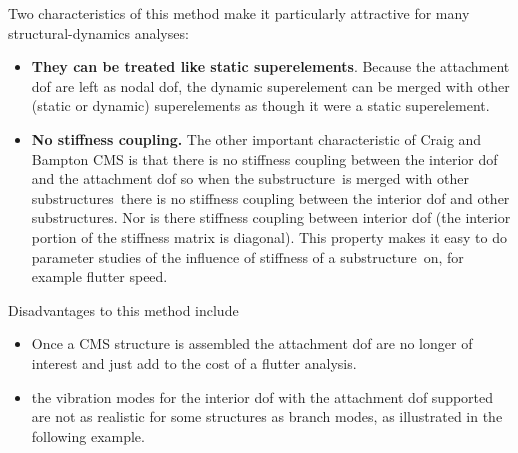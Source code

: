 \documentclass[11pt,openany,twoside]{book}
\numberwithin{equation}{section}		%
\newcommand{\Ss}{substructure}
\newcommand{\Sss}{substructures}
\begin{document}
Two characteristics of this method make it particularly attractive
for many structural-dynamics analyses:
\begin{itemize}
\item
{\bfseries They can be treated like static superelements\/}.
Because the attachment dof are left as nodal dof, the dynamic superelement
can be merged with other (static or dynamic) superelements
as though it were a static superelement.
                
\item {\bfseries No stiffness coupling.} The other important
	characteristic of Craig and Bampton CMS is that there is no
	stiffness coupling between the interior dof and the attachment
	dof so when the \Ss\ is merged with other \Sss\ there is no
	stiffness coupling between the interior dof and other \Sss.
	Nor is there stiffness coupling between interior dof
	(the interior portion of the stiffness matrix is diagonal).
	This property makes it easy to do parameter studies of the
	influence of stiffness of a \Ss\ on, for example flutter speed.
\end{itemize}
Disadvantages to this method include
\begin{itemize}
\item Once a CMS structure is assembled the attachment dof are no longer
of interest and just add to the cost of a flutter analysis.
\item the vibration modes for the interior dof with the attachment dof
	supported are not as realistic for some structures as branch modes,
	as illustrated in the following example.
\end{itemize}
\end{document}
